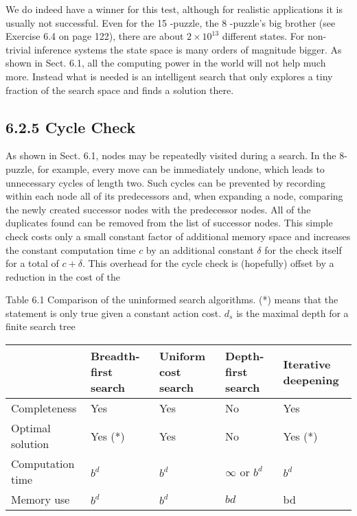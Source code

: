 \documentclass[10pt]{article}
\begin{document}
We do indeed have a winner for this test, although for realistic applications it is usually not successful. Even for the 15 -puzzle, the 8 -puzzle's big brother (see Exercise 6.4 on page 122), there are about $2 \times 10^{13}$ different states. For non-trivial inference systems the state space is many orders of magnitude bigger. As shown in Sect. 6.1, all the computing power in the world will not help much more. Instead what is needed is an intelligent search that only explores a tiny fraction of the search space and finds a solution there.

\subsection*{6.2.5 Cycle Check}
As shown in Sect. 6.1, nodes may be repeatedly visited during a search. In the 8-puzzle, for example, every move can be immediately undone, which leads to unnecessary cycles of length two. Such cycles can be prevented by recording within each node all of its predecessors and, when expanding a node, comparing the newly created successor nodes with the predecessor nodes. All of the duplicates found can be removed from the list of successor nodes. This simple check costs only a small constant factor of additional memory space and increases the constant computation time $c$ by an additional constant $\delta$ for the check itself for a total of $c+\delta$. This overhead for the cycle check is (hopefully) offset by a reduction in the cost of the

Table 6.1 Comparison of the uninformed search algorithms. (*) means that the statement is only true given a constant action cost. $d_{s}$ is the maximal depth for a finite search tree

\begin{center}
\begin{tabular}{|l|l|l|l|l|}
\hline
 & Breadth-first search & Uniform cost search & Depth-first search & Iterative deepening \\
\hline
Completeness & Yes & Yes & No & Yes \\
\hline
Optimal solution & Yes (*) & Yes & No & Yes (*) \\
\hline
Computation time & $b^{d}$ & $b^{d}$ & $\infty$ or $b^{d}$ & $b^{d}$ \\
\hline
Memory use & $b^{d}$ & $b^{d}$ & $b d$ & bd \\
\hline
\end{tabular}
\end{center}
\end{document}
